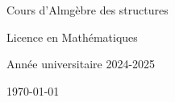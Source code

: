 \begin{titlepage}
    \centering
    \vspace*{1cm}

    \Huge
    Cours d'Almgèbre des structures

    \vspace{0.5cm}

    \LARGE
    Licence en Mathématiques

    \vspace{1.5cm}


    \vfill

    \Large
    Année universitaire 2024-2025

    \vspace{0.8cm}

    \today
\end{titlepage}

